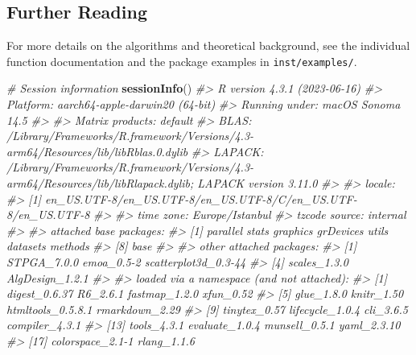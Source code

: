 \documentclass[
]{article}
\newenvironment{Shaded}{\begin{snugshade}}{\end{snugshade}}
\newcommand{\CommentTok}[1]{\textcolor[rgb]{0.56,0.35,0.01}{\textit{#1}}}
\newcommand{\FunctionTok}[1]{\textcolor[rgb]{0.13,0.29,0.53}{\textbf{#1}}}
\newcommand{\NormalTok}[1]{#1}
\begin{document}
\subsection{Further Reading}\label{further-reading}

For more details on the algorithms and theoretical background, see the
individual function documentation and the package examples in
\texttt{inst/examples/}.

\begin{Shaded}
\begin{Highlighting}[]
\CommentTok{\# Session information}
\FunctionTok{sessionInfo}\NormalTok{()}
\CommentTok{\#\textgreater{} R version 4.3.1 (2023{-}06{-}16)}
\CommentTok{\#\textgreater{} Platform: aarch64{-}apple{-}darwin20 (64{-}bit)}
\CommentTok{\#\textgreater{} Running under: macOS Sonoma 14.5}
\CommentTok{\#\textgreater{} }
\CommentTok{\#\textgreater{} Matrix products: default}
\CommentTok{\#\textgreater{} BLAS:   /Library/Frameworks/R.framework/Versions/4.3{-}arm64/Resources/lib/libRblas.0.dylib }
\CommentTok{\#\textgreater{} LAPACK: /Library/Frameworks/R.framework/Versions/4.3{-}arm64/Resources/lib/libRlapack.dylib;  LAPACK version 3.11.0}
\CommentTok{\#\textgreater{} }
\CommentTok{\#\textgreater{} locale:}
\CommentTok{\#\textgreater{} [1] en\_US.UTF{-}8/en\_US.UTF{-}8/en\_US.UTF{-}8/C/en\_US.UTF{-}8/en\_US.UTF{-}8}
\CommentTok{\#\textgreater{} }
\CommentTok{\#\textgreater{} time zone: Europe/Istanbul}
\CommentTok{\#\textgreater{} tzcode source: internal}
\CommentTok{\#\textgreater{} }
\CommentTok{\#\textgreater{} attached base packages:}
\CommentTok{\#\textgreater{} [1] parallel  stats     graphics  grDevices utils     datasets  methods  }
\CommentTok{\#\textgreater{} [8] base     }
\CommentTok{\#\textgreater{} }
\CommentTok{\#\textgreater{} other attached packages:}
\CommentTok{\#\textgreater{} [1] STPGA\_7.0.0          emoa\_0.5{-}2           scatterplot3d\_0.3{-}44}
\CommentTok{\#\textgreater{} [4] scales\_1.3.0         AlgDesign\_1.2.1     }
\CommentTok{\#\textgreater{} }
\CommentTok{\#\textgreater{} loaded via a namespace (and not attached):}
\CommentTok{\#\textgreater{}  [1] digest\_0.6.37     R6\_2.6.1          fastmap\_1.2.0     xfun\_0.52        }
\CommentTok{\#\textgreater{}  [5] glue\_1.8.0        knitr\_1.50        htmltools\_0.5.8.1 rmarkdown\_2.29   }
\CommentTok{\#\textgreater{}  [9] tinytex\_0.57      lifecycle\_1.0.4   cli\_3.6.5         compiler\_4.3.1   }
\CommentTok{\#\textgreater{} [13] tools\_4.3.1       evaluate\_1.0.4    munsell\_0.5.1     yaml\_2.3.10      }
\CommentTok{\#\textgreater{} [17] colorspace\_2.1{-}1  rlang\_1.1.6}
\end{Highlighting}
\end{Shaded}
\end{document}
